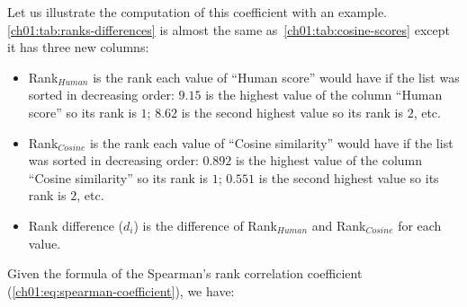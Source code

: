       \noindent Let us illustrate the computation of this coefficient with an
      example. \autoref{ch01:tab:ranks-differences} is almost the same
      as~\autoref{ch01:tab:cosine-scores} except it has three new columns:

      \begin{itemize}
        \item Rank${}_{Human}$ is the rank each value of ``Human score'' would
          have if the list was sorted in decreasing order: $9.15$ is the highest
          value of the column ``Human score'' so its rank is $1$; $8.62$ is the
          second highest value so its rank is $2$, etc.
        \item Rank${}_{Cosine}$ is the rank each value of ``Cosine similarity''
          would have if the list was sorted in decreasing order: $0.892$ is the
          highest value of the column ``Cosine similarity'' so its rank is $1$;
          $0.551$ is the second highest value so its rank is $2$, etc.
        \item Rank difference ($d_i$) is the difference of Rank${}_{Human}$ and
          Rank${}_{Cosine}$ for each value.
      \end{itemize}

      \begin{table}[h!]
        \caption{Rank differences used to compute the Spearman's rank
        correlation coefficient.}
        \label{ch01:tab:ranks-differences}
      \end{table}

      \noindent Given the formula of the Spearman's rank correlation coefficient
      (\autoref{ch01:eq:spearman-coefficient}), we have:


